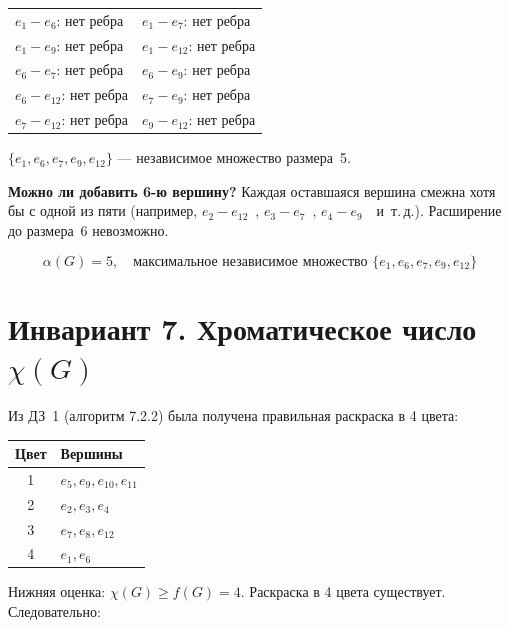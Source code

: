\documentclass[a4paper,12pt]{article}
\begin{document}
\begin{center}
	\renewcommand{\arraystretch}{1.2}
	\begin{tabular}{ll}
		$e_1 - e_6$: нет ребра \checkmark    & $e_1 - e_7$: нет ребра \checkmark    \\
		$e_1 - e_9$: нет ребра \checkmark    & $e_1 - e_{12}$: нет ребра \checkmark \\
		$e_6 - e_7$: нет ребра \checkmark    & $e_6 - e_9$: нет ребра \checkmark    \\
		$e_6 - e_{12}$: нет ребра \checkmark & $e_7 - e_9$: нет ребра \checkmark    \\
		$e_7 - e_{12}$: нет ребра \checkmark & $e_9 - e_{12}$: нет ребра \checkmark \\
	\end{tabular}
\end{center}

$\{e_1, e_6, e_7, e_9, e_{12}\}$ --- независимое множество размера~5.

\textbf{Можно ли добавить 6-ю вершину?}
Каждая оставшаяся вершина смежна хотя бы с одной из пяти (например,
$e_2 - e_{12}$~\checkmark, $e_3 - e_7$~\checkmark, $e_4 - e_9$~\checkmark\ и~т.\,д.).
Расширение до размера~6 невозможно.

\[
	\boxed{\alpha(G) = 5, \quad \text{максимальное независимое множество } \{e_1, e_6, e_7, e_9, e_{12}\}}
\]

\section*{Инвариант 7. Хроматическое число $\chi(G)$}

Из ДЗ~1 (алгоритм 7.2.2) была получена правильная раскраска в 4 цвета:

\begin{center}
	\begin{tabular}{|c|l|}
		\hline
		Цвет & Вершины                    \\
		\hline
		1    & $e_5, e_9, e_{10}, e_{11}$ \\
		2    & $e_2, e_3, e_4$            \\
		3    & $e_7, e_8, e_{12}$         \\
		4    & $e_1, e_6$                 \\
		\hline
	\end{tabular}
\end{center}

Нижняя оценка: $\chi(G) \geq f(G) = 4$. Раскраска в 4 цвета существует.
Следовательно:
\end{document}
